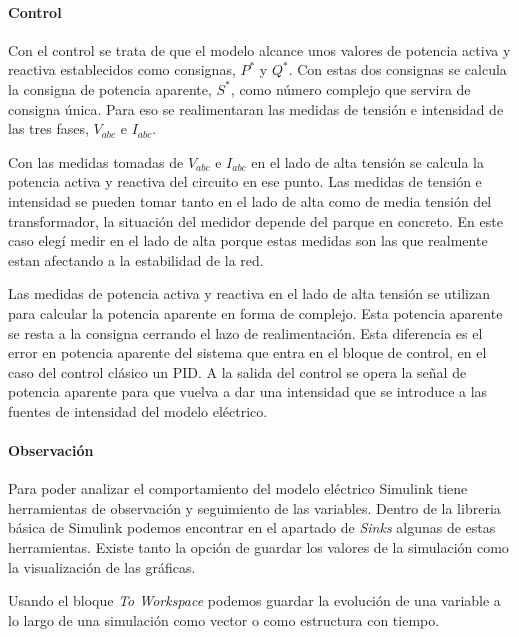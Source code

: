 \documentclass{book}
\begin{document}
		\paragraph{Control} 
Con el control se trata de que el modelo alcance unos valores de potencia activa y reactiva establecidos como consignas, $P^*$ y $Q^*$. Con estas dos consignas se calcula la consigna de potencia aparente, $S^*$, como n\'umero complejo que servira de consigna \'unica. Para eso se realimentaran las medidas de tensi\'on e intensidad de las tres fases, $V_{abc}$ e $I_{abc}$. \par

Con las medidas tomadas de $V_{abc}$ e $I_{abc}$ en el lado de alta tensi\'on se calcula la potencia activa y reactiva del circuito en ese punto. Las medidas de tensi\'on e intensidad se pueden tomar tanto en el lado de alta como de media tensi\'on del transformador, la situaci\'on del medidor depende del parque en concreto. En este caso eleg\'i medir en el lado de alta porque estas medidas son las que realmente estan afectando a la estabilidad de la red. \par

Las medidas de potencia activa y reactiva en el lado de alta tensi\'on se utilizan para calcular la potencia aparente en forma de complejo. Esta potencia aparente se resta a la consigna cerrando el lazo de realimentaci\'on. Esta diferencia es el error en potencia aparente del sistema que entra en el bloque de control, en el caso del control cl\'asico un PID. A la salida del control se opera la señal de potencia aparente para que vuelva a dar una intensidad que se introduce a las fuentes de intensidad del modelo el\'ectrico.  \par

		\paragraph{Observaci\'on}
Para poder analizar el comportamiento del modelo el\'ectrico Simulink tiene herramientas de observación y seguimiento de las variables. Dentro de la libreria b\'asica de Simulink podemos encontrar en el apartado de \emph{Sinks} algunas de estas herramientas. Existe tanto la opci\'on de guardar los valores de la simulaci\'on como la visualizaci\'on de las gr\'aficas. \par

Usando el bloque \emph{To Workspace} podemos guardar la evoluci\'on de una variable a lo largo de una simulaci\'on como vector o como estructura con tiempo.  \par
\end{document}
